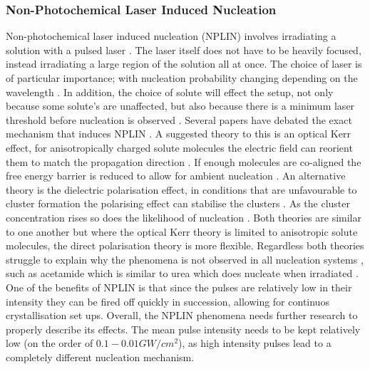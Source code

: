 \subsubsection{Non-Photochemical Laser Induced Nucleation}
Non-photochemical laser induced nucleation (NPLIN) involves irradiating 
a solution with a pulsed laser \cite{Garetz1996,Garetz2002,Sun2006}. 
The laser itself does not have to be heavily focused, instead irradiating
a large region of the solution all at once. The choice of laser is of
particular importance; with nucleation probability changing depending 
on the wavelength \cite{Kacker2017}. In addition, the choice of solute will 
effect the setup, not only because some solute's are unaffected, but also 
because there is a minimum laser threshold before nucleation is observed 
\cite{Garetz2002}. Several papers have debated the exact mechanism that 
induces NPLIN \cite{Garetz2002, Knott2011}. A suggested theory to this is 
an optical Kerr effect, for anisotropically charged solute molecules the 
electric field can reorient them to match the propagation direction 
\cite{Garetz2002}. If enough molecules are co-aligned the free energy 
barrier is reduced to allow for ambient nucleation \cite{Knott2011}. 
An alternative theory is the dielectric polarisation effect, in 
conditions that are unfavourable to cluster formation the polarising 
effect can stabilise the clusters \cite{Alexander2008}. As the cluster 
concentration rises so does the likelihood of nucleation \cite{Vekilov2010}. 
Both theories are similar to one another but where the optical Kerr theory
is limited to anisotropic solute molecules, the direct polarisation 
theory is more flexible. Regardless both theories struggle to explain
why the phenomena is not observed in all nucleation systems 
\cite{Korede2023}, such as acetamide which is similar to urea which 
does nucleate when irradiated \cite{Ward2016}. One of the benefits of 
NPLIN is that since the pulses are relatively low in their intensity 
they can be fired off quickly in succession, allowing for continuos 
crystallisation set ups. Overall, the NPLIN phenomena needs further 
research to properly describe its effects. The mean pulse intensity 
needs to be kept relatively low (on the order of $0.1-0.01 GW/cm^2$), 
as high intensity pulses lead to a completely different nucleation 
mechanism.


